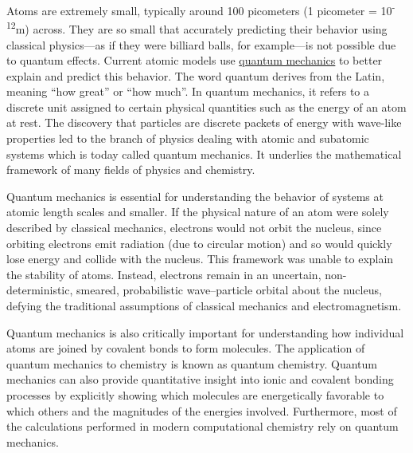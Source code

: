 Atoms are extremely small, typically around 100 picometers (1 picometer
= 10\textsuperscript{-12}m) across. They are so small that accurately
predicting their behavior using classical physics---as if they were
billiard balls, for example---is not possible due to quantum effects.
Current atomic models use
\href{https://en.wikipedia.org/wiki/Quantum_mechanics}{quantum
mechanics} to better explain and predict this behavior. The word quantum
derives from the Latin, meaning ``how great'' or ``how much''. In
quantum mechanics, it refers to a discrete unit assigned to certain
physical quantities such as the energy of an atom at rest. The discovery
that particles are discrete packets of energy with wave-like properties
led to the branch of physics dealing with atomic and subatomic systems
which is today called quantum mechanics. It underlies the mathematical
framework of many fields of physics and chemistry.

Quantum mechanics is essential for understanding the behavior of systems
at atomic length scales and smaller. If the physical nature of an atom
were solely described by classical mechanics, electrons would not orbit
the nucleus, since orbiting electrons emit radiation (due to circular
motion) and so would quickly lose energy and collide with the nucleus.
This framework was unable to explain the stability of atoms. Instead,
electrons remain in an uncertain, non-deterministic, smeared,
probabilistic wave--particle orbital about the nucleus, defying the
traditional assumptions of classical mechanics and electromagnetism.

Quantum mechanics is also critically important for understanding how
individual atoms are joined by covalent bonds to form molecules. The
application of quantum mechanics to chemistry is known as quantum
chemistry. Quantum mechanics can also provide quantitative insight into
ionic and covalent bonding processes by explicitly showing which
molecules are energetically favorable to which others and the magnitudes
of the energies involved. Furthermore, most of the calculations
performed in modern computational chemistry rely on quantum mechanics.

